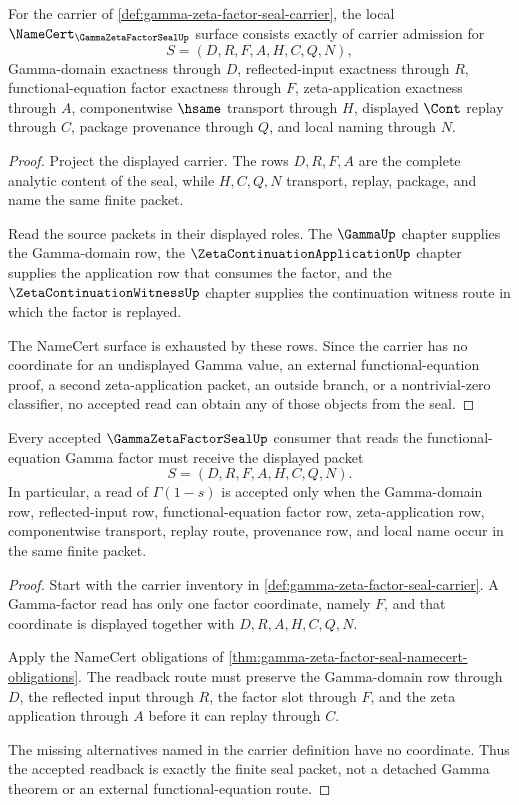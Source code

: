 \begin{theorem}
\label{thm:gamma-zeta-factor-seal-namecert-obligations}
For the carrier of \autoref{def:gamma-zeta-factor-seal-carrier}, the local
$\NameCert_{\GammaZetaFactorSealUp}$ surface consists exactly of carrier
admission for
$$
S=(D,R,F,A,H,C,Q,N),
$$
Gamma-domain exactness through $D$, reflected-input exactness through $R$,
functional-equation factor exactness through $F$, zeta-application exactness
through $A$, componentwise $\hsame$ transport through $H$, displayed $\Cont$
replay through $C$, package provenance through $Q$, and local naming through
$N$.
\end{theorem}
\begin{proof}
Project the displayed carrier. The rows $D,R,F,A$ are the complete analytic
content of the seal, while $H,C,Q,N$ transport, replay, package, and name the
same finite packet.

Read the source packets in their displayed roles. The $\GammaUp$ chapter
supplies the Gamma-domain row, the $\ZetaContinuationApplicationUp$ chapter
supplies the application row that consumes the factor, and the
$\ZetaContinuationWitnessUp$ chapter supplies the continuation witness route
in which the factor is replayed.

The NameCert surface is exhausted by these rows. Since the carrier has no
coordinate for an undisplayed Gamma value, an external functional-equation
proof, a second zeta-application packet, an outside branch, or a nontrivial-zero
classifier, no accepted read can obtain any of those objects from the seal.
\end{proof}

\begin{theorem}
\label{thm:gamma-zeta-factor-seal-readback}
Every accepted $\GammaZetaFactorSealUp$ consumer that reads the
functional-equation Gamma factor must receive the displayed packet
$$
S=(D,R,F,A,H,C,Q,N).
$$
In particular, a read of $\Gamma(1-s)$ is accepted only when the Gamma-domain
row, reflected-input row, functional-equation factor row, zeta-application row,
componentwise transport, replay route, provenance row, and local name occur in
the same finite packet.
\end{theorem}
\begin{proof}
Start with the carrier inventory in
\autoref{def:gamma-zeta-factor-seal-carrier}. A Gamma-factor read has only one
factor coordinate, namely $F$, and that coordinate is displayed together with
$D,R,A,H,C,Q,N$.

Apply the NameCert obligations of
\autoref{thm:gamma-zeta-factor-seal-namecert-obligations}. The readback route
must preserve the Gamma-domain row through $D$, the reflected input through
$R$, the factor slot through $F$, and the zeta application through $A$ before
it can replay through $C$.

The missing alternatives named in the carrier definition have no coordinate.
Thus the accepted readback is exactly the finite seal packet, not a detached
Gamma theorem or an external functional-equation route.
\end{proof}

